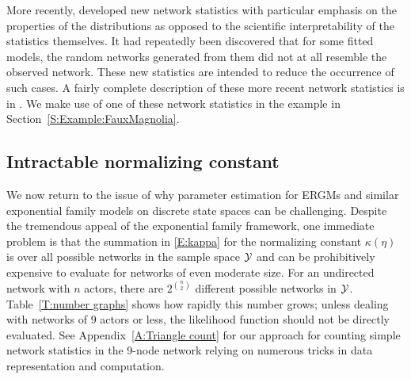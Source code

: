 More recently, \citet*{Handcock:2006, Hunter:2006, recentp*} developed
new network statistics with particular emphasis on the properties of 
the distributions as opposed to 
the scientific interpretability of the statistics themselves.
It had repeatedly been discovered that for some fitted models, the random networks generated
 from them did not at all resemble the observed network.  These new statistics
are intended to reduce the occurrence of such cases.
 A fairly complete description of these more recent network 
statistics is in \citet*{Morris:2008}.  We make use of one of these network statistics
in the example in Section~\ref{S:Example:FauxMagnolia}.



\subsection{Intractable normalizing constant} \label{S:intractable}
We now return to the issue of why parameter estimation for ERGMs and 
similar exponential family models on discrete state spaces can be challenging.
Despite the tremendous appeal of the exponential family framework, one 
immediate problem is that the summation in \eqref{E:kappa} for the 
normalizing constant $\kappa(\eta)$ is over all possible 
networks in the sample space ${\mathcal Y}$ and can be prohibitively expensive to 
evaluate for networks of even moderate size.
For an undirected network with $n$ actors, there are $2^{{n\choose 2} }$ 
different possible networks in ${\mathcal Y}$.  Table~\ref{T:number graphs} shows how rapidly this number grows; 
unless dealing with networks of 9 actors or less, the likelihood function 
should not be directly evaluated.  See Appendix~\ref{A:Triangle count}
for our approach for counting simple network statistics in the 9-node network
relying on numerous tricks in data representation and computation.

